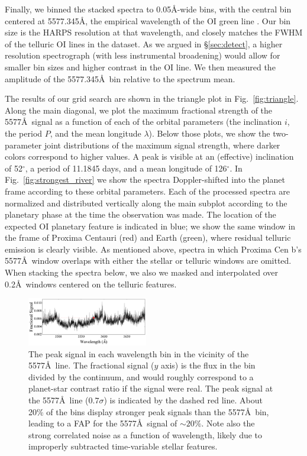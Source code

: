 \documentclass{emulateapj}
\begin{document}
Finally, we binned the stacked spectra to 0.05\AA-wide bins, with the central bin centered at 5577.345\AA, the empirical wavelength of the OI green line \citep{CabannesDufay1955,Chamberlain1961}. Our bin size is the HARPS resolution at that wavelength, and closely matches the FWHM of the telluric OI lines in the dataset. As we argued in \S\ref{sec:detect}, a higher resolution spectrograph (with less instrumental broadening) would allow for smaller bin sizes and higher contrast in the OI line. We then measured the amplitude of the 5577.345\AA\ bin relative to the spectrum mean.

The results of our grid search are shown in the triangle plot in Fig.~\ref{fig:triangle}. Along the main diagonal, we plot the maximum fractional strength of the 5577\AA\ signal as a function of each of the orbital parameters (the inclination $i$, the period $P$, and the mean longitude $\lambda$). Below those plots, we show the two-parameter joint distributions of the maximum signal strength, where darker colors correspond to higher values. A peak is visible at an (effective) inclination of 52$^\circ$, a period of 11.1845 days, and a mean longitude of 126$^\circ$. In Fig.~\ref{fig:strongest_river} we show the spectra Doppler-shifted into the planet frame according to these orbital parameters. Each of the processed spectra are normalized and distributed vertically along the main subplot according to the planetary phase at the time the observation was made. The location of the expected OI planetary feature is indicated in blue; we show the same window in the frame of Proxima Centauri (red) and Earth (green), where residual telluric emission is clearly visible. As mentioned above, spectra in which Proxima Cen b's 5577\AA\ window overlaps with either the stellar or telluric windows are omitted. When stacking the spectra below, we also we masked and interpolated over 0.2\AA\ windows centered on the telluric features.

\begin{figure}[bt]
\includegraphics[width=0.47\textwidth]{5577_max_signal_vs_wavelength.pdf}
\caption{The peak signal in each wavelength bin in the vicinity of the 5577\AA\ line. The fractional signal ($y$ axis) is the flux in the bin divided by the continuum, and would roughly correspond to a planet-star contrast ratio if the signal were real. The peak signal at the 5577\AA\ line ($0.7\sigma$) is indicated by the dashed red line. About 20\% of the bins display stronger peak signals than the 5577\AA\ bin, leading to a FAP for the 5577\AA\ signal of ${\sim} 20\%$. Note also the strong correlated noise as a function of wavelength, likely due to improperly subtracted time-variable stellar features.\\[0in]}
\label{fig:max_signal_vs_wavelength}
\end{figure}
\end{document}
